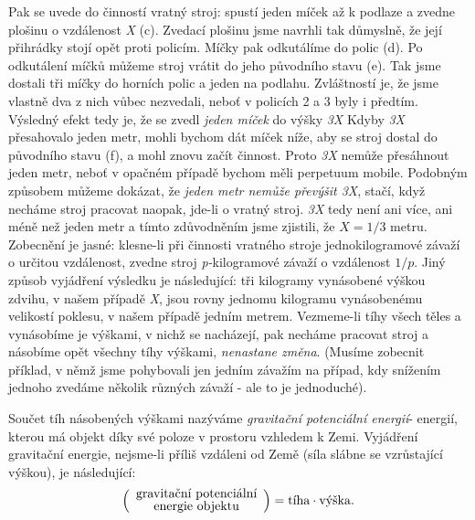     Pak se uvede do činností vratný stroj: spustí jeden míček až k podlaze a zvedne plošinu o 
    vzdálenost \emph{X} (c). Zvedací plošinu jsme navrhli tak důmyslně, že její přihrádky stojí 
    opět proti policím. Míčky pak odkutálíme do polic (d). Po odkutálení míčků můžeme stroj vrátit 
    do jeho původního stavu (e). Tak jsme dostali tři míčky do horních polic a jeden na podlahu. 
    Zvláštností je, že jsme vlastně dva z nich vůbec nezvedali, neboť v policích 2 a 3 byly i 
    předtím. Výsledný efekt tedy je, že se zvedl \emph{jeden míček} do výšky \emph{3X} Kdyby 
    \emph{3X} přesahovalo jeden metr, mohli bychom dát míček níže, aby se stroj dostal do původního 
    stavu (f), a mohl znovu začít činnost. Proto \emph{3X} nemůže přesáhnout jeden metr, neboť v 
    opačném případě bychom měli perpetuum mobile. Podobným způsobem můžeme dokázat, že \emph{jeden 
    metr nemůže převýšit 3X}, stačí, když necháme stroj pracovat naopak, jde-li o vratný stroj. 
    \emph{3X} tedy není ani více, ani méně než jeden metr a tímto zdůvodněním jsme zjistili, že 
    \(X= 1/3\) metru. Zobecnění je jasné: klesne-li při činnosti vratného stroje jednokilogramové 
    závaží o určitou vzdálenost, zvedne stroj \emph{p-}kilogramové závaží o vzdálenost \(1/p\). 
    Jiný způsob vyjádření výsledku je následující: tři kilogramy vynásobené výškou zdvihu, v našem 
    případě \emph{X}, jsou rovny jednomu kilogramu vynásobenému velikostí poklesu, v našem případě 
    jedním metrem. Vezmeme-li tíhy všech těles a vynásobíme je výškami, v nichž se nacházejí, pak 
    necháme pracovat stroj a násobíme opět všechny tíhy výškami, \emph{nenastane změna}. (Musíme 
    zobecnit příklad, v němž jsme pohybovali jen jedním závažím na případ, kdy snížením jednoho 
    zvedáme několik různých závaží - ale to je jednoduché).
    
    Součet tíh násobených výškami nazýváme \emph{gravitační potenciální energií}- energií, kterou 
    má objekt díky své poloze v prostoru vzhledem k Zemi. Vyjádření gravitační energie, nejsme-li 
    příliš vzdáleni od Země (síla slábne se vzrůstající výškou), je následující:
    \begin{equation}\label{fyz:eq056}
      \renewcommand{\arraystretch}{0.8}
      \left(
        \begin{array}{c}
          \text{gravitační potenciální}  \\
          \text{energie objektu}
        \end{array}
      \right) =
      \text{tíha} \cdot \text{výška}.
    \end{equation}

